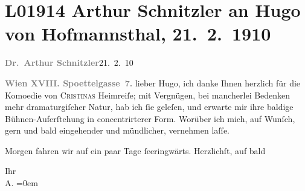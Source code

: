 

\section[Arthur Schnitzler an Hugo von Hofmannsthal, 21. 2. 1910]{L01914 Arthur Schnitzler an Hugo von Hofmannsthal, 21. 2. 1910}
\nopagebreak{}
\rehead{ }\normalsize\beginnumbering{}
\toendnotes[C]{\smallbreak\pagebreak[2]}
\pstart
           {\pb}\textcolor{gray}{\textbf{Dr. Arthur Schnitzler}}\hfill 21. 2. 10\pend
           
\pstart
           \textcolor{gray}{\textbf{Wien XVIII. Spoettelgasse 7.}}\pend
           \vspace{0.5em}
\pstart
           lieber Hugo, ich danke Ihnen herzlich für die Komoedie von \textsc{Cristinas} Heimreiſe; mit Vergnügen, bei mancherlei
               Bedenken mehr dramaturgiſcher Natur, hab ich ſie geleſen, und erwarte mir {\pb}ihre baldige \introOben{}Bühnen-\introOben{}Auferſtehung
               in concentrirterer Form. Worüber ich mich, auf Wunſch, gern und bald eingehender und
               mündlicher, vernehmen laſſe.\pend
           
\pstart
           Morgen fahren wir auf ein paar Tage ſe{\geminationm}eringwärts. Herzlichſt, auf bald\pend
           
\pstart
           Ihr{\\[\baselineskip]}\spacefill\mbox{A.}\pend
           \leftskip=0em{}\endnumbering{}  
      